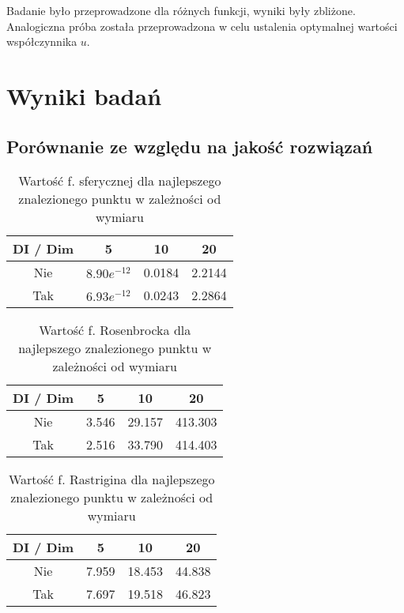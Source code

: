 \documentclass[12pt]{article}
\begin{document}
Badanie było przeprowadzone dla różnych funkcji, wyniki były zbliżone.
Analogiczna próba została przeprowadzona w celu ustalenia optymalnej wartości współczynnika $u$.


\pagebreak
\section{Wyniki badań}
\subsection*{Porównanie ze względu na jakość rozwiązań}

\begin{table}[h!]
	\centering
	\begin{tabular}{|c|c|c|c|}
		\hline
		DI  / Dim & 5             & 10     & 20     \\
		\hline
		Nie       & $8.90e^{-12}$ & 0.0184 & 2.2144 \\
		Tak       & $6.93e^{-12}$ & 0.0243 & 2.2864 \\
		\hline
	\end{tabular}
	\caption{Wartość f. sferycznej dla najlepszego znalezionego punktu w zależności od wymiaru}
	\label{tab:sphere_values}
\end{table}

\begin{table}[h!]
	\centering
	\begin{tabular}{|c|c|c|c|}
		\hline
		DI / Dim & 5     & 10     & 20      \\
		\hline
		Nie      & 3.546 & 29.157 & 413.303 \\
		Tak      & 2.516 & 33.790 & 414.403 \\
		\hline
	\end{tabular}
	\caption{Wartość f. Rosenbrocka dla najlepszego znalezionego punktu w zależności od wymiaru}
	\label{tab:rosenbrock_values}
\end{table}

\begin{table}[h!]
	\centering
	\begin{tabular}{|c|c|c|c|}
		\hline
		DI / Dim & 5     & 10     & 20     \\
		\hline
		Nie      & 7.959 & 18.453 & 44.838 \\
		Tak      & 7.697 & 19.518 & 46.823 \\
		\hline
	\end{tabular}
	\caption{Wartość f. Rastrigina dla najlepszego znalezionego punktu w zależności od wymiaru}
	\label{tab:rastrigin_values}
\end{table}
\end{document}

